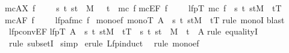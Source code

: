\begin{isabellebody}
{\isachardoublequote}mc{\isacharparenleft}AX\ f{\isacharparenright}\ \ \ \ {\isacharequal}\ {\isacharbraceleft}s{\isachardot}\ {\isasymforall}t{\isachardot}\ {\isacharparenleft}s{\isacharcomma}t{\isacharparenright}\ {\isasymin}\ M\ \ {\isasymlongrightarrow}\ t\ {\isasymin}\ mc\ f{\isacharbraceright}{\isachardoublequote}\isanewline
{\isachardoublequote}mc{\isacharparenleft}EF\ f{\isacharparenright}\ \ \ \ {\isacharequal}\ lfp{\isacharparenleft}{\isasymlambda}T{\isachardot}\ mc\ f\ {\isasymunion}\ {\isacharbraceleft}s{\isachardot}\ {\isasymexists}t{\isachardot}\ {\isacharparenleft}s{\isacharcomma}t{\isacharparenright}{\isasymin}M\ {\isasymand}\ t{\isasymin}T{\isacharbraceright}{\isacharparenright}{\isachardoublequote}\isanewline
{\isachardoublequote}mc{\isacharparenleft}AF\ f{\isacharparenright}\ \ \ \ {\isacharequal}\ lfp{\isacharparenleft}af{\isacharparenleft}mc\ f{\isacharparenright}{\isacharparenright}{\isachardoublequote}\isanewline
\isanewline
{}\ mono{\isacharunderscore}ef{\isacharcolon}\ {\isachardoublequote}mono{\isacharparenleft}{\isasymlambda}T{\isachardot}\ A\ {\isasymunion}\ {\isacharbraceleft}s{\isachardot}\ {\isasymexists}t{\isachardot}\ {\isacharparenleft}s{\isacharcomma}t{\isacharparenright}{\isasymin}M\ {\isasymand}\ t{\isasymin}T{\isacharbraceright}{\isacharparenright}{\isachardoublequote}\isanewline
{}rule\ monoI{\isacharparenright}\isanewline
{}blast{\isacharparenright}\isanewline
\isanewline
{}\ lfp{\isacharunderscore}conv{\isacharunderscore}EF{\isacharcolon}\isanewline
{\isachardoublequote}lfp{\isacharparenleft}{\isasymlambda}T{\isachardot}\ A\ {\isasymunion}\ {\isacharbraceleft}s{\isachardot}\ {\isasymexists}t{\isachardot}\ {\isacharparenleft}s{\isacharcomma}t{\isacharparenright}{\isasymin}M\ {\isasymand}\ t{\isasymin}T{\isacharbraceright}{\isacharparenright}\ {\isacharequal}\ {\isacharbraceleft}s{\isachardot}\ {\isasymexists}t{\isachardot}\ {\isacharparenleft}s{\isacharcomma}t{\isacharparenright}\ {\isasymin}\ M{\isacharcircum}{\isacharasterisk}\ {\isasymand}\ t\ {\isasymin}\ A{\isacharbraceright}{\isachardoublequote}\isanewline
{}rule\ equalityI{\isacharparenright}\isanewline
\ rule\ subsetI{\isacharparenright}\isanewline
\ simp{\isacharparenright}\isanewline
\ erule\ Lfp{\isachardot}induct{\isacharparenright}\isanewline
\ \ rule\ mono{\isacharunderscore}ef{\isacharparenright}\isanewline

\end{isabellebody}
